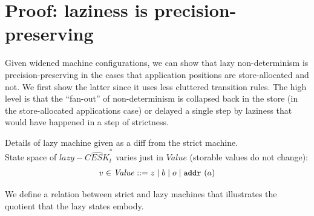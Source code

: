 \documentclass[preprint,onecolumn,9pt]{sigplanconf} %
\begin{document}
\appendix
\section{Proof: laziness is precision-preserving}
Given widened machine configurations, we can show that lazy
non-determinism is precision-preserving in the cases that application
positions are store-allocated and not. We first show the latter since
it uses less cluttered transition rules. The high level is that the
``fan-out'' of non-determinism is collapsed back in the store (in the
store-allocated applications case) or delayed a single step by
laziness that would have happened in a step of strictness.

Details of lazy machine given as a diff from the strict machine. \\
State space of $lazy-\widehat{CESK}^*_t$ varies just in
$\mathit{Value}$ (storable values do not change):
\begin{align*}
v \in \mathit{Value} &::= z \mid b \mid o \mid {\tt addr{\ }}({a}) \\
\end{align*}

We define a relation between strict and lazy machines that illustrates
the quotient that the lazy states embody.

\newcommand{\vapprx}[3]{#1 \cong_{#2} #3}
\newcommand{\kapprx}[3]{#1 \cong_{#2} #3}
\newcommand{\lapprx}[3]{#1 \approx_{#2} #3}
\newcommand{\apprx}[3]{#1 \sim_{#2} #3}
\newcommand{\capprx}[2]{#1 \sim #2}
\end{document}
